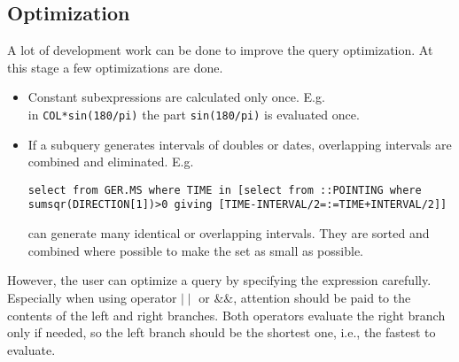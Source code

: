 \subsection{Optimization}
A lot of development work can be done to improve the query optimization.
At this stage a few optimizations are done.
\begin{itemize}
\item Constant subexpressions are calculated only once. E.g.
\\in \texttt{COL*sin(180/pi)} the part \texttt{sin(180/pi)} is
evaluated once.
\item If a subquery generates intervals of doubles or dates, overlapping
intervals are combined and eliminated. E.g.
\begin{verbatim}
select from GER.MS where TIME in [select from ::POINTING where
sumsqr(DIRECTION[1])>0 giving [TIME-INTERVAL/2=:=TIME+INTERVAL/2]]
\end{verbatim}
can generate many identical or overlapping intervals. They are
sorted and combined where possible to make the set as small as possible.
\end{itemize}

However, the user can optimize a query by specifying the expression
carefully. Especially when using operator $\mid\mid$ or \&\&,
attention should be
paid to the contents of the left and right branches. Both operators
evaluate the right branch only if needed, so the left branch
should be the shortest one, i.e., the fastest to evaluate.

